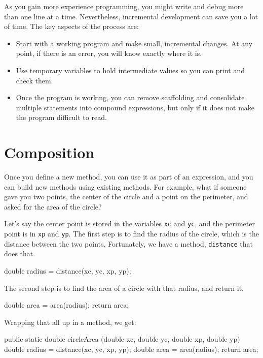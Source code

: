 As you gain more experience programming, you might
write and debug more than one line at a time.  Nevertheless,
incremental development can save you a lot of time.
The key aspects of the process are:

\begin{itemize}

\item Start with a working program and make small, incremental
changes.  At any point, if there is an error, you will know
exactly where it is.

\item Use temporary variables to hold intermediate values so
you can print and check them.

\item Once the program is working, you can remove
scaffolding and consolidate multiple statements into
compound expressions, but only if it does not make the program
difficult to read.

\end{itemize}


\section{Composition}

Once you define a new method,
you can use it as part of an expression, and you can build
new methods using existing methods.  For example, what if someone
gave you two points, the center of the circle and a point on
the perimeter, and asked for the area of the circle?

Let's say the center point is stored in the variables {\tt xc}
and {\tt yc}, and the perimeter point is in {\tt xp} and
{\tt yp}.  The first step is to find the radius of the circle, which
is the distance between the two points.  Fortunately, we have
a method, {\tt distance} that does that.

\begin{code}
    double radius = distance(xc, yc, xp, yp);
\end{code}

The second step is to find the area of a circle with that
radius, and return it.

\begin{code}
    double area = area(radius);
    return area;
\end{code}

Wrapping that all up in a method, we get:

\begin{code}
  public static double circleArea
              (double xc, double yc, double xp, double yp) {
    double radius = distance(xc, yc, xp, yp);
    double area = area(radius);
    return area;
  }
\end{code}

